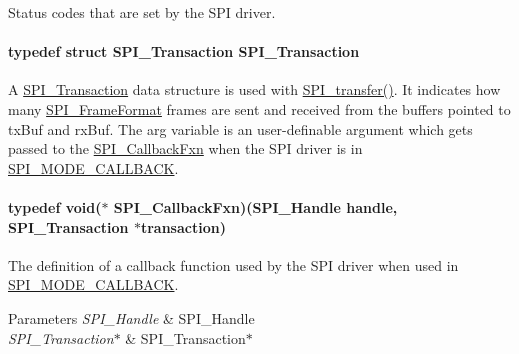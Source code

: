 Status codes that are set by the S\-P\-I driver. 

\paragraph[{S\-P\-I\-\_\-\-Transaction}]{\setlength{\rightskip}{0pt plus 5cm}typedef struct {\bf S\-P\-I\-\_\-\-Transaction}  {\bf S\-P\-I\-\_\-\-Transaction}}\label{_s_p_i_8h_a906af7b4126dcfc52dfa905eb08408fc}


A \hyperlink{struct_s_p_i___transaction}{S\-P\-I\-\_\-\-Transaction} data structure is used with \hyperlink{_s_p_i_8h_a989e17f96b54fcc3dc2cac5f8ac6bdb2}{S\-P\-I\-\_\-transfer()}. It indicates how many \hyperlink{_s_p_i_8h_a53949638d43ae7bf71b74c2b136ad206}{S\-P\-I\-\_\-\-Frame\-Format} frames are sent and received from the buffers pointed to tx\-Buf and rx\-Buf. The arg variable is an user-\/definable argument which gets passed to the \hyperlink{_s_p_i_8h_aeb03e7608a14021c3b0acf92c90e2168}{S\-P\-I\-\_\-\-Callback\-Fxn} when the S\-P\-I driver is in \hyperlink{_s_p_i_8h_ab9ea76c6529d6076eee5e1c4a5a92c6fa5631e69925c47a62a261c78ebbda39fb}{S\-P\-I\-\_\-\-M\-O\-D\-E\-\_\-\-C\-A\-L\-L\-B\-A\-C\-K}. 

\paragraph[{S\-P\-I\-\_\-\-Callback\-Fxn}]{\setlength{\rightskip}{0pt plus 5cm}typedef void($\ast$ S\-P\-I\-\_\-\-Callback\-Fxn)({\bf S\-P\-I\-\_\-\-Handle} handle, {\bf S\-P\-I\-\_\-\-Transaction} $\ast$transaction)}\label{_s_p_i_8h_aeb03e7608a14021c3b0acf92c90e2168}


The definition of a callback function used by the S\-P\-I driver when used in \hyperlink{_s_p_i_8h_ab9ea76c6529d6076eee5e1c4a5a92c6fa5631e69925c47a62a261c78ebbda39fb}{S\-P\-I\-\_\-\-M\-O\-D\-E\-\_\-\-C\-A\-L\-L\-B\-A\-C\-K}. 


\begin{DoxyParams}{Parameters}
{\em S\-P\-I\-\_\-\-Handle} & S\-P\-I\-\_\-\-Handle \\
\hline
{\em S\-P\-I\-\_\-\-Transaction$\ast$} & S\-P\-I\-\_\-\-Transaction$\ast$ \\
\hline
\end{DoxyParams}
